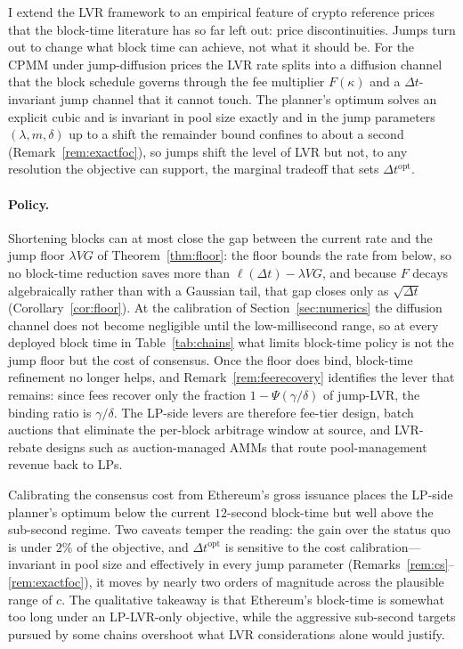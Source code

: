 \documentclass[runningheads]{llncs}
\newcommand{\dt}{\Delta t}
\newcommand{\1}{\mathbf{1}}
\begin{document}
I extend the LVR framework to an empirical feature of crypto reference prices that the block-time literature has so far left out: price discontinuities. Jumps turn out to change what block time can achieve, not what it should be. For the CPMM under jump-diffusion prices the LVR rate splits into a diffusion channel that the block schedule governs through the fee multiplier $F(\kappa)$ and a $\dt$-invariant jump channel that it cannot touch. The planner's optimum solves an explicit cubic and is invariant in pool size exactly and in the jump parameters $(\lambda,m,\delta)$ up to a shift the remainder bound confines to about a second (Remark~\ref{rem:exactfoc}), so jumps shift the level of LVR but not, to any resolution the objective can support, the marginal tradeoff that sets $\dt^{\mathrm{opt}}$.

\paragraph{Policy.}
Shortening blocks can at most close the gap between the current rate and the jump floor $\lambda VG$ of Theorem~\ref{thm:floor}: the floor bounds the rate from below, so no block-time reduction saves more than $\ell(\dt) - \lambda VG$, and because $F$ decays algebraically rather than with a Gaussian tail, that gap closes only as $\sqrt{\dt}$ (Corollary~\ref{cor:floor}). At the calibration of Section~\ref{sec:numerics} the diffusion channel does not become negligible until the low-millisecond range, so at every deployed block time in Table~\ref{tab:chains} what limits block-time policy is not the jump floor but the cost of consensus. Once the floor does bind, block-time refinement no longer helps, and Remark~\ref{rem:feerecovery} identifies the lever that remains: since fees recover only the fraction $1-\Psi(\gamma/\delta)$ of jump-LVR, the binding ratio is $\gamma/\delta$. The LP-side levers are therefore fee-tier design, batch auctions that eliminate the per-block arbitrage window at source, and LVR-rebate designs such as auction-managed AMMs that route pool-management revenue back to LPs.

Calibrating the consensus cost from Ethereum's gross issuance places the LP-side planner's optimum below the current $12$-second block-time but well above the sub-second regime. Two caveats temper the reading: the gain over the status quo is under $2\%$ of the objective, and $\dt^{\mathrm{opt}}$ is sensitive to the cost calibration---invariant in pool size and effectively in every jump parameter (Remarks~\ref{rem:cs}--\ref{rem:exactfoc}), it moves by nearly two orders of magnitude across the plausible range of $c$. The qualitative takeaway is that Ethereum's block-time is somewhat too long under an LP-LVR-only objective, while the aggressive sub-second targets pursued by some chains overshoot what LVR considerations alone would justify.
\end{document}
